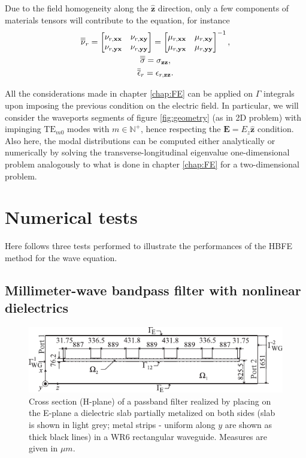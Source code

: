 Due to the field homogeneity along the $\hat{\mathbf{z}}$ direction, only a few components of materials tensors will contribute to the equation, for instance
\begin{gather}
\overline{\overline{\nu}}_r = 
\begin{bmatrix}
\nu_{r,\mathbf{x}\mathbf{x}} & \nu_{r,\mathbf{x}\mathbf{y}}\\
\nu_{r,\mathbf{y}\mathbf{x}} & \nu_{r,\mathbf{y}\mathbf{y}}
\end{bmatrix} = \begin{bmatrix}
\mu_{r,\mathbf{x}\mathbf{x}} & \mu_{r,\mathbf{x}\mathbf{y}}\\
\mu_{r,\mathbf{y}\mathbf{x}} & \mu_{r,\mathbf{y}\mathbf{y}}
\end{bmatrix}^{-1},\\
\overline{\overline{\sigma}} = \sigma_{\mathbf{z}\mathbf{z}},\\
\overline{\overline{\epsilon}}_r = \epsilon_{r,\mathbf{z}\mathbf{z}}.
\end{gather}

All the considerations made in chapter \ref{chap:FE} can be applied on $\Gamma$ integrals upon imposing the previous condition on the electric field. In particular, we will consider the waveports segments of figure \ref{fig:geometry} (as in 2D problem) with impinging $\mathrm{TE}_{m0}$ modes with $m \in \mathbb{N}^+$, hence respecting the $\mathbf{E} = E_z \hat{\mathbf{z}}$ condition. Also here, the modal distributions can be computed either analytically \cite{pelosi2009quick} or numerically by solving the transverse-longitudinal eigenvalue one-dimensional problem analogously to what is done in chapter \ref{chap:FE} for a two-dimensional problem.

\section{Numerical tests}

Here follows three tests performed to illustrate the performances of the HBFE method for the wave equation.

\subsection{Millimeter-wave bandpass filter with nonlinear dielectrics}

\begin{figure}[ht!]
\centering
\includegraphics[width=15.4cm]{bilat}
\caption{Cross section (H-plane) of a passband filter realized
by placing on the E-plane a dielectric slab partially metalized on both sides
(slab is shown in light grey; metal strips - uniform along $y$ are shown as
thick black lines) in a WR6 rectangular waveguide. Measures are given in $\mu{m}$.}
\label{fig:bilat}
\end{figure}


